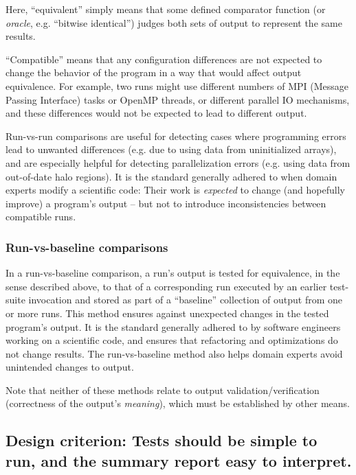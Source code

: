 \documentclass[conference]{IEEEtran}
\begin{document}
Here, ``equivalent'' simply means that some defined comparator function (or \emph{oracle}, e.g. ``bitwise identical'') judges both sets of output to represent the same results.

``Compatible'' means that any configuration differences are not expected to change the behavior of the program in a way that would affect output equivalence. For example, two runs might use different numbers of MPI (Message Passing Interface) tasks or OpenMP threads, or different parallel IO mechanisms, and these differences would not be expected to lead to different output.

Run-vs-run comparisons are useful for detecting cases where programming errors lead to unwanted differences (e.g. due to using data from uninitialized arrays), and are especially helpful for detecting parallelization errors (e.g. using data from out-of-date halo regions). It is the standard generally adhered to when domain experts modify a scientific code: Their work is \emph{expected} to change (and hopefully improve) a program's output -- but not to introduce inconsistencies between compatible runs.

\subsubsection{Run-vs-baseline comparisons}

In a run-vs-baseline comparison, a run's output is tested for equivalence, in the sense described above, to that of a corresponding run executed by an earlier test-suite invocation and stored as part of a ``baseline'' collection of output from one or more runs. This method ensures against unexpected changes in the tested program's output. It is the standard generally adhered to by software engineers working on a scientific code, and ensures that refactoring and optimizations do not change results. The run-vs-baseline method also helps domain experts avoid unintended changes to output.

Note that neither of these methods relate to output validation/verification (correctness of the output's \emph{meaning}), which must be established by other means.

\subsection{Design criterion: Tests should be simple to run, and the summary report easy to interpret.}
\end{document}
